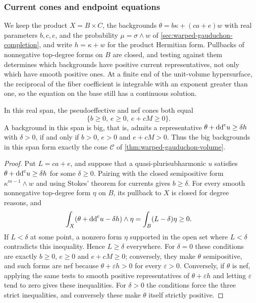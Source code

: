 \subsubsection{Current cones and endpoint equations}
\label{sec:warped-current-endpoint-equations}

We keep the product $X=B\times C$, the backgrounds $\theta=b\kappa+(ca+e)w$ with real parameters $b,c,e$, and the probability $\mu=\sigma\wedge w$ of \cref{sec:warped-gauduchon-completion}, and write $h=\kappa+w$ for the product Hermitian form. Pullbacks of nonnegative top-degree forms on $B$ are closed, and testing against them determines which backgrounds have positive current representatives, not only which have smooth positive ones. At a finite end of the unit-volume hypersurface, the reciprocal of the fiber coefficient is integrable with an exponent greater than one, so the equation on the base still has a continuous solution.

\begin{proposition}\label{prop:warped-current-cones}
In this real span, the pseudoeffective and nef cones both equal
\[
 \{b\geq0,\ e\geq0,\ e+cM\geq0\}.
\]
A background in this span is big, that is, admits a representative $\theta+\mathrm{dd}^{\mathrm{c}} u\geq\delta h$ with $\delta>0$, if and only if $b>0$, $e>0$ and $e+cM>0$. Thus the big backgrounds in this span form exactly the cone $\mathscr C$ of \cref{thm:warped-gauduchon-volume}.
\end{proposition}
\begin{proof}
Put $L=ca+e$, and suppose that a quasi-plurisubharmonic $u$ satisfies $\theta+\mathrm{dd}^{\mathrm{c}} u\geq\delta h$ for some $\delta\geq0$. Pairing with the closed semipositive form $\kappa^{m-1}\wedge w$ and using Stokes' theorem for currents gives $b\geq\delta$. For every smooth nonnegative top-degree form $\eta$ on $B$, its pullback to $X$ is closed for degree reasons, and
\[
 \int_X(\theta+\mathrm{dd}^{\mathrm{c}} u-\delta h)\wedge\eta
   =\int_B(L-\delta)\eta\geq0.
\]
If $L<\delta$ at some point, a nonzero form $\eta$ supported in the open set where $L<\delta$ contradicts this inequality. Hence $L\geq\delta$ everywhere. For $\delta=0$ these conditions are exactly $b\geq0$, $e\geq0$ and $e+cM\geq0$; conversely, they make $\theta$ semipositive, and such forms are nef because $\theta+\varepsilon h>0$ for every $\varepsilon>0$. Conversely, if $\theta$ is nef, applying the same tests to smooth positive representatives of $\theta+\varepsilon h$ and letting $\varepsilon$ tend to zero gives these inequalities. For $\delta>0$ the conditions force the three strict inequalities, and conversely these make $\theta$ itself strictly positive.
\end{proof}

